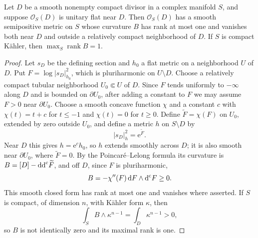 \begin{proposition}\label{prop:flat-divisor-rank-one-curvature}
Let $D$ be a smooth nonempty compact divisor in a complex manifold $S$, and suppose $\mathcal O_S(D)$ is unitary flat near $D$. Then $\mathcal O_S(D)$ has a smooth semipositive metric on $S$ whose curvature $B$ has rank at most one and vanishes both near $D$ and outside a relatively compact neighborhood of $D$. If $S$ is compact K\"ahler, then $\max_S\operatorname{rank}B=1$.
\end{proposition}
\begin{proof}
Let $s_D$ be the defining section and $h_0$ a flat metric on a neighborhood $U$ of $D$. Put $F=\log|s_D|_{h_0}^2$, which is pluriharmonic on $U\setminus D$. Choose a relatively compact tubular neighborhood $U_0\Subset U$ of $D$. Since $F$ tends uniformly to $-\infty$ along $D$ and is bounded on $\partial U_0$, after adding a constant to $F$ we may assume $F>0$ near $\partial U_0$. Choose a smooth concave function $\chi$ and a constant $c$ with $\chi(t)=t+c$ for $t\leq-1$ and $\chi(t)=0$ for $t\geq0$. Define $\widetilde F=\chi(F)$ on $U_0$, extended by zero outside $U_0$, and define a metric $h$ on $S\setminus D$ by
\[
 |s_D|_h^2=\mathrm e^{\widetilde F}.
\]
Near $D$ this gives $h=\mathrm e^c h_0$, so $h$ extends smoothly across $D$; it is also smooth near $\partial U_0$, where $\widetilde F=0$. By the Poincar\'e--Lelong formula its curvature is $B=[D]-\mathrm{dd}^{\mathrm{c}}\widetilde F$, and off $D$, since $F$ is pluriharmonic,
\[
 B=-\chi''(F)\,\mathrm dF\wedge\mathrm d^{\mathrm c} F\geq0.
\]
This smooth closed form has rank at most one and vanishes where asserted. If $S$ is compact, of dimension $n$, with K\"ahler form $\kappa$, then
\[
 \int_SB\wedge\kappa^{n-1}=\int_D\kappa^{n-1}>0,
\]
so $B$ is not identically zero and its maximal rank is one.
\end{proof}

